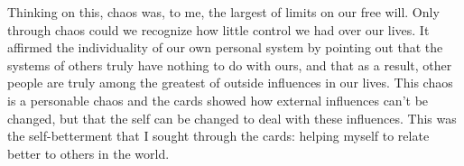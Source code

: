 \documentclass{book}
\begin{document}
Thinking on this, chaos was, to me, the largest of limits on our free will.  Only through chaos could we recognize how little control we had over our lives.  It affirmed the individuality of our own personal system by pointing out that the systems of others truly have nothing to do with ours, and that as a result, other people are truly among the greatest of outside influences in our lives.  This chaos is a personable chaos and the cards showed how external influences can't be changed, but that the self can be changed to deal with these influences.  This was the self-betterment that I sought through the cards: helping myself to relate better to others in the world.

\chapter{}

\chapter{}

\chapter{}

\chapter{}

\chapter{}

\chapter{}

\chapter{}

\chapter{}



\end{document}
